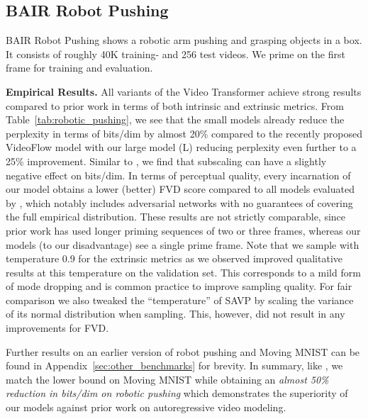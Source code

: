 \documentclass{article} \usepackage{iclr2020_conference,times}
\begin{document}
\subsection{BAIR Robot Pushing}\label{sec:bair}

BAIR Robot Pushing \citep{ebert17sna} shows a robotic arm pushing and grasping objects in a box. It consists of roughly 40K training- and 256 test videos. We prime on the first frame for training and evaluation.

\textbf{Empirical Results.}
All variants of the Video Transformer achieve strong results compared to prior work in terms of both intrinsic and extrinsic metrics.
From Table~\ref{tab:robotic_pushing}, we see that the small models already reduce the perplexity in terms of bits/dim by almost 20\% compared to the recently proposed VideoFlow model \citep{Kumar2019VideoFlowAF} with our large model (L) reducing perplexity even further to a 25\% improvement. Similar to \citet{Menick2018GeneratingHF}, we find that subscaling can have a slightly negative effect on bits/dim. In terms of perceptual quality, every incarnation of our model obtains a lower (better) FVD score compared to all models evaluated by \citet{Unterthiner2018FVD}, which notably includes adversarial networks with no guarantees of covering the full empirical distribution.
These results are not strictly comparable, since prior work has used longer priming sequences of two \citep{Babaeizadeh2017SV2P,Lee2018SAVP} or three \citep{Kumar2019VideoFlowAF} frames, whereas our models (to our disadvantage) see a single prime frame. Note that we sample with temperature 0.9 for the extrinsic metrics as we observed improved qualitative results at this temperature on the validation set. This corresponds to a mild form of mode dropping and is common practice to improve sampling quality. For fair comparison we also tweaked the ``temperature'' of SAVP by scaling the variance of its normal distribution when sampling. This, however, did not result in any improvements for FVD. 

Further results on an earlier version of robot pushing \citep{Finn2016RobotPushing} and Moving MNIST \citep{Srivastava2015MovingMNIST} can be found in Appendix~\ref{sec:other_benchmarks} for brevity. In summary, like \citet{Kalchbrenner2016VideoPN}, we match the lower bound on Moving MNIST while obtaining an \emph{almost 50\% reduction in bits/dim on robotic pushing} which demonstrates the superiority of our models against prior work on autoregressive video modeling.
\end{document}
